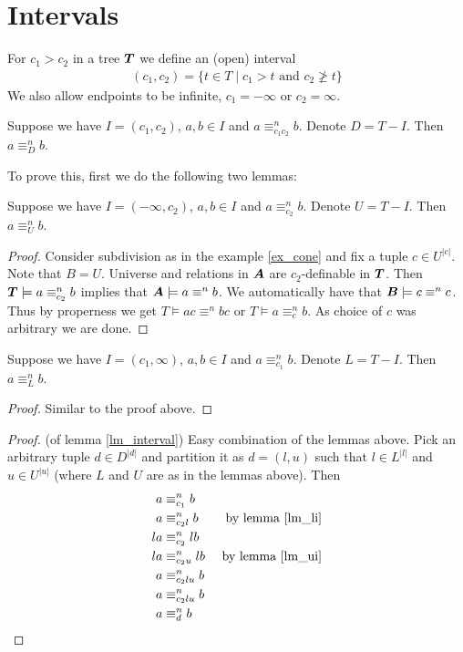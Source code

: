 \documentclass{amsart}
\DeclareMathOperator{\TT}{\boldface T}
\DeclareMathOperator{\A}{\boldface A}
\DeclareMathOperator{\B}{\boldface B}
\begin{document}
\section{Intervals}

\begin{Definition}
	For $c_1 > c_2$ in a tree $\TT$ we define an (open) interval
	\begin{align*}
		(c_1, c_2) = \{t \in T \mid c_1 > t \text{ and } c_2 \ngeq t\}
	\end{align*}
	We also allow endpoints to be infinite, $c_1 = -\infty$ or $c_2 = \infty$.
\end{Definition}

\begin{Lemma} \label{lm_interval}
	Suppose we have $I = (c_1, c_2)$, $a,b \in I$ and $a \equiv^n_{c_1c_2} b$. Denote $D = T - I$. Then $a \equiv^n_D b$.
\end{Lemma}

To prove this, first we do the following two lemmas:

\begin{Lemma}
	Suppose we have $I = (-\infty, c_2)$, $a,b \in I$ and $a \equiv^n_{c_2} b$. Denote $U = T - I$. Then $a \equiv^n_U b$.
\end{Lemma}

\begin{proof} \label{lm_ui}
	Consider subdivision as in the example \ref{ex_cone} and fix a tuple $c \in U^{|c|}$. Note that $B = U$. Universe and relations in $\A$ are $c_2$-definable in $\TT$. Then $\TT \models a \equiv^n_{c_2} b$ implies that $\A \models a \equiv^n b$. We automatically have that $\B \models c \equiv^n c$. Thus by properness we get $T \models ac \equiv^n bc$ or $T \models a \equiv^n_c b$. As choice of $c$ was arbitrary we are done.
\end{proof}

\begin{Lemma} \label{lm_li}
	Suppose we have $I = (c_1, \infty)$, $a,b \in I$ and $a \equiv^n_{c_1} b$. Denote $L = T - I$. Then $a \equiv^n_L b$.
\end{Lemma}
\begin{proof}
	Similar to the proof above.
\end{proof}

\begin{proof} (of lemma \ref{lm_interval})
	Easy combination of the lemmas above. Pick an arbitrary tuple $d \in D^{|d|}$ and partition it as $d = (l, u)$ such that $l \in L^{|l|}$ and $u \in U^{|u|}$ (where $L$ and $U$ are as in the lemmas above). Then 
	\begin{align*}
		a &\equiv^n_{c_1} b \\
		a &\equiv^n_{c_2l} b 		&\text{ by lemma \ref{lm_li}}\\
		la &\equiv^n_{c_2} lb \\
		la &\equiv^n_{c_2u} lb  &\text{ by lemma \ref{lm_ui}}\\
		a &\equiv^n_{c_2lu} b \\
		a &\equiv^n_{c_2lu} b \\
		a &\equiv^n_{d} b
	\end{align*}
\end{proof}
\end{document}
